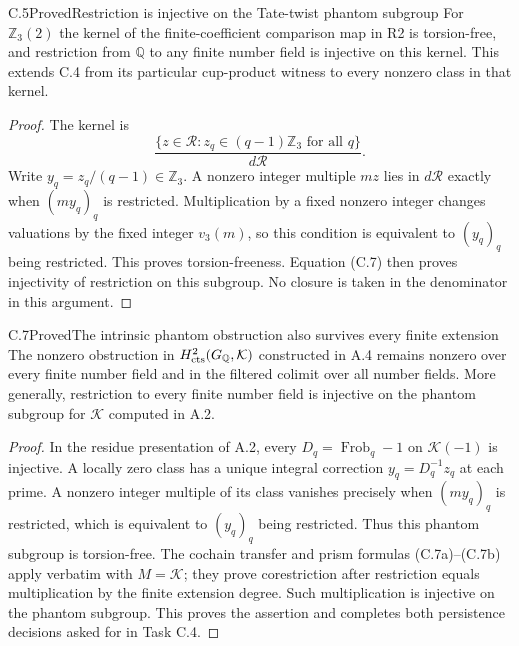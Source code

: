 \begin{statement}{C.5}{Proved}{Restriction is injective on the Tate-twist phantom subgroup}
For $\mathbb Z_3(2)$ the kernel of the finite-coefficient
comparison map in R2 is torsion-free, and restriction
from $\mathbb Q$ to any finite number field is injective
on this kernel.  This extends C.4 from its particular
cup-product witness to every nonzero class in that
kernel.
\end{statement}
\begin{proof}
The kernel is
\[
 \frac{\{z\in\mathcal R:z_q\in(q-1)\mathbb Z_3\text{ for all }q\}}
      {d\mathcal R}.
\]
Write $y_q=z_q/(q-1)\in\mathbb Z_3$.  A nonzero integer
multiple $mz$ lies in $d\mathcal R$ exactly when
$(my_q)_q$ is restricted.  Multiplication by a fixed
nonzero integer changes valuations by the fixed
integer $v_3(m)$, so this condition is equivalent to
$(y_q)_q$ being restricted.  This proves torsion-freeness.
Equation (C.7) then proves injectivity of restriction
on this subgroup.  No closure is taken in the
denominator in this argument.
\end{proof}

\begin{statement}{C.7}{Proved}{The intrinsic phantom obstruction also survives every finite extension}
The nonzero obstruction in $H^2_{\rm cts}(G_{\mathbb Q},\mathcal K)$
constructed in A.4 remains nonzero over every finite number
field and in the filtered colimit over all number fields.
More generally, restriction to every finite number field is
injective on the phantom subgroup for $\mathcal K$ computed
in A.2.
\end{statement}
\begin{proof}
In the residue presentation of A.2, every
$D_q=\operatorname{Frob}_q-1$ on $\mathcal K(-1)$ is
injective.  A locally zero class has a unique integral
correction $y_q=D_q^{-1}z_q$ at each prime.
A nonzero integer multiple of its class vanishes
precisely when $(my_q)_q$ is restricted, which is
equivalent to $(y_q)_q$ being restricted.
Thus this phantom subgroup is torsion-free.
The cochain transfer and prism formulas (C.7a)--(C.7b)
apply verbatim with $M=\mathcal K$; they prove
corestriction after restriction equals multiplication
by the finite extension degree.  Such multiplication
is injective on the phantom subgroup.
This proves the assertion and completes both
persistence decisions asked for in Task C.4.
\end{proof}

